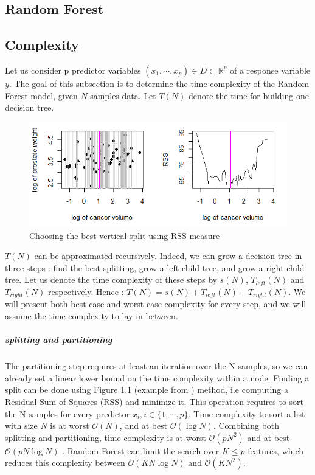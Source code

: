 \documentclass[english,11pt,openany]{report}
\theoremstyle{definition}
\newcommand{\R}{\mathbb{R}}
\newcommand{\bigO}{\mathcal{O}}
\theoremstyle{plain}
\theoremstyle{definition}
\begin{document}
\begin{appendices}
\chapter{Random Forest}

\section{Complexity}

Let us consider p predictor variables $(x_1, \cdots, x_p) \in D \subset \R^p$  of a response variable $y$. The goal of this subsection is to determine the time complexity of the Random Forest model, given $N$ samples data. 
\newline
Let $T(N)$ denote the time for building one decision tree. 

\begin{figure}[h!]
	\includegraphics[scale=0.8]{time_complexity/sorting_split.png}
	\caption{Choosing the best vertical split using RSS measure} \label{figure:sorting}
\end{figure}


$T(N)$ can be approximated recursively. 
Indeed, we can grow a decision tree in three steps : find the best splitting, grow a left child tree, and grow a right child tree.
\newline 
Let us denote the time complexity of these steps by $s(N)$, $T_{left}(N)$ and $T_{right}(N)$ respectively. 
Hence : $T(N) = s(N) + T_{left}(N) + T_{right}(N)$.
We will present both best case and worst case complexity for every step, and we will assume the time complexity to lay in between. 
\paragraph{splitting and partitioning}
	The partitioning step requires at least an iteration over the N samples, so we can already set a linear lower bound on the time complexity within a node.
	Finding a split can be done using Figure \ref{figure:sorting} (example from \cite{Cutler:slides}) method, i.e computing a Residual Sum of Squares (RSS) and minimize it. 
	This operation requires to sort the N samples for every predictor $x_i, i\in \{1, \cdots, p\}$. 
	Time complexity to sort a list with size $N$ is at worst $\mathcal{O} (N)$, and at best $\bigO(\log N)$. 
	Combining both splitting and partitioning, time complexity is at worst $\mathcal{O} (p N^2)$ and at best $\bigO(p N \log N)$ . 
	Random Forest can limit the search over $K \leq p$ features, which reduces this complexity between $\mathcal{O} (K N\log N)$ and $\mathcal{O} (K N^2)$. 
	

\end{appendices}
\end{document}
